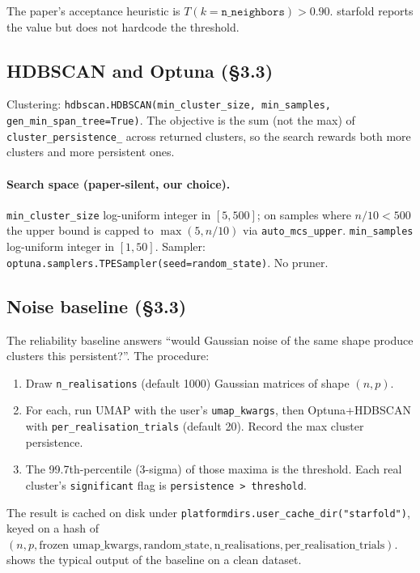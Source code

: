 \documentclass[11pt,a4paper]{article}
\begin{document}
The paper's acceptance heuristic is \(T(k = \texttt{n\_neighbors}) > 0.90\). \textsf{starfold} reports the value but does not hardcode the threshold.

\subsection{HDBSCAN and Optuna (§3.3)}

Clustering: \texttt{hdbscan.HDBSCAN(min\_cluster\_size, min\_samples, gen\_min\_span\_tree=True)}. The objective is the sum (not the max) of \texttt{cluster\_persistence\_} across returned clusters, so the search rewards both more clusters and more persistent ones.

\paragraph{Search space (paper-silent, our choice).} \texttt{min\_cluster\_size} log-uniform integer in \([5, 500]\); on samples where \(n / 10 < 500\) the upper bound is capped to \(\max(5, n/10)\) via \texttt{auto\_mcs\_upper}. \texttt{min\_samples} log-uniform integer in \([1, 50]\). Sampler: \texttt{optuna.samplers.TPESampler(seed=random\_state)}. No pruner.

\subsection{Noise baseline (§3.3)}

The reliability baseline answers ``would Gaussian noise of the same shape produce clusters this persistent?''. The procedure:

\begin{enumerate}[leftmargin=*,nosep]
  \item Draw \texttt{n\_realisations} (default \num{1000}) Gaussian matrices of shape \((n, p)\).
  \item For each, run UMAP with the user's \texttt{umap\_kwargs}, then Optuna+HDBSCAN with \texttt{per\_realisation\_trials} (default 20). Record the max cluster persistence.
  \item The 99.7th-percentile (3-sigma) of those maxima is the threshold. Each real cluster's \texttt{significant} flag is \texttt{persistence > threshold}.
\end{enumerate}

The result is cached on disk under \texttt{platformdirs.user\_cache\_dir("starfold")}, keyed on a hash of \((n, p, \text{frozen umap\_kwargs}, \text{random\_state}, \text{n\_realisations}, \text{per\_realisation\_trials})\).  shows the typical output of the baseline on a clean dataset.
\end{document}
